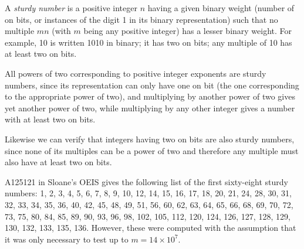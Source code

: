 \documentclass[12pt]{article}
\begin{document}
A \emph{sturdy number} is a positive integer $n$ having a given binary weight (number of on bits, or instances of the digit 1 in its binary representation) such that no multiple $mn$ (with $m$ being any positive integer) has a lesser binary weight. For example, 10 is written 1010 in binary; it has two on bits; any multiple of 10 has at least two on bits.

All powers of two corresponding to positive integer exponents are sturdy numbers, since its representation can only have one on bit (the one corresponding to the appropriate power of two), and multiplying by another power of two gives yet another power of two, while multiplying by any other integer gives a number with at least two on bits.

Likewise we can verify that integers having two on bits are also sturdy numbers, since none of its multiples can be a power of two and therefore any multiple must also have at least two on bits.

A125121 in Sloane's OEIS gives the following list of the first sixty-eight sturdy numbers: 1, 2, 3, 4, 5, 6, 7, 8, 9, 10, 12, 14, 15, 16, 17, 18, 20, 21, 24, 28, 30, 31, 32, 33, 34, 35, 36, 40, 42, 45, 48, 49, 51, 56, 60, 62, 63, 64, 65, 66, 68, 69, 70, 72, 73, 75, 80, 84, 85, 89, 90, 93, 96, 98, 102, 105, 112, 120, 124, 126, 127, 128, 129, 130, 132, 133, 135, 136. However, these were computed with the assumption that it was only necessary to test up to $m = 14 \times 10^7$.
\end{document}
